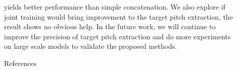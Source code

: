 \documentclass[final]{beamer}
\newlength{\sepwidth}
\newlength{\colwidth}
\newcommand{\separatorcolumn}{\begin{column}{\sepwidth}\end{column}}
\begin{document}
\begin{frame}[t]
\begin{columns}[t]
            \separatorcolumn

            \begin{column}{\colwidth}
                \begin{block}{}
                    yields better performance than simple concatenation. We also explore if joint training would bring improvement to the target pitch extraction, the result shows no obvious help. In the future work, we will continue to improve the precision of target pitch extraction and do more experiments on large scale models to validate the proposed methods.
                \end{block}
                \begin{block}{References}

                    \footnotesize{}

                \end{block}
            \end{column}

            \separatorcolumn
        \end{columns}
    \end{frame}
\end{document}
